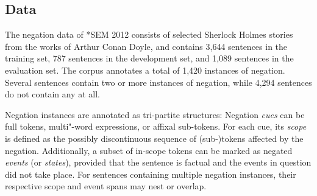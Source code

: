 \documentclass[11pt,a4paper]{article}
\theoremstyle{plain}
\begin{document}
\begin{figure*}
  \caption{An example of how ConanDoyle-neg annotations are converted to a
      dependency"-style graph structure.
  We omit the special root node $r_0$ and mark roots instead with vertical
  arcs.
  The arcs are labelled for {scope} (\texttt{S}), {event}
  (\texttt{E}), and {multi"-word"-cue} (\texttt{M}).
  }
  \label{fig:neg_graph}
\end{figure*}

\subsection{Data}

The negation data of *SEM 2012 consists of selected Sherlock Holmes stories from the works of Arthur
Conan Doyle, and contains 3,644 sentences in the training set, 787
sentences in the development set, and 1,089 sentences in the evaluation
set.
The corpus annotates a total of 1,420 instances of negation.
Several sentences contain two or more instances of negation, while 4,294 sentences do not contain any at all.

Negation instances are annotated as tri-partite structures:
Negation \emph{cues} can be full tokens, multi"-word expressions, or
affixal sub-tokens.
For each cue, its \emph{scope} is defined as the possibly discontinuous
sequence of (sub-)tokens affected by the negation.
Additionally, a subset of in-scope tokens can be marked as
negated \emph{events} (or \emph{states}), provided that the sentence
is factual and the events in question did not take place. 
For sentences containing multiple negation instances, their respective
scope and event spans may nest or overlap.
\end{document}
